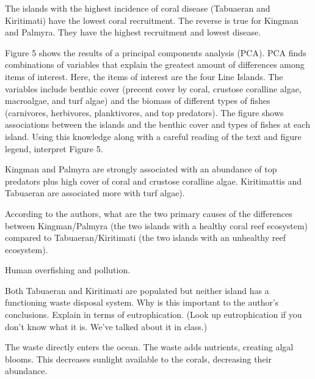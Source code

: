 \documentclass[11pt, addpoints]{exam}
\begin{document}
\begin{questions}
\begin{solution}
The islands with the highest incidence of coral disease (Tabuaeran and Kiritimati) have the lowest coral recruitment. The reverse is true for Kingman and Palmyra. They have the highest recruitment and lowest disease.
\end{solution}

\question[5]
Figure 5 shows the results of a principal components analysis (PCA). PCA finds combinations of variables that explain the greatest amount of differences among items of interest. Here, the items of interest are the four Line Islands. The variables include benthic cover (precent cover by coral, crustose coralline algae, macroalgae, and turf algae) and the biomass of different types of fishes (carnivores, herbivores, planktivores, and top predators). The figure shows associations between the islands and the benthic cover and types of fishes at each island. Using this knowledge along with a careful reading of the text and figure legend, interpret Figure 5.  

\begin{solution}
Kingman and Palmyra are strongly associated with an abundance of top predators plus high cover of coral and crustose coralline algae. Kiritimattis and Tabuaeran are associated more with turf algae).
\end{solution}


\question[5]
According to the authors, what are the two primary causes of the differences between Kingman/Palmyra (the two islands with a healthy coral reef ecosystem) compared to Tabuaeran/Kiritimati (the two islands with an unhealthy reef ecosystem). 
\begin{solution}
Human overfishing and pollution.  
\end{solution}


\question[5]
Both Tabuaeran and Kiritimati are populated but neither island has a functioning waste disposal system. Why is this important to the author's conclusions. Explain in terms of eutrophication. (Look up eutrophication if you don't know what it is. We've talked about it in class.)
\begin{solution}
The waste directly enters the ocean. The waste adds nutrients, creating algal blooms. This decreases sunlight available to the corals, decreasing their abundance.
\end{solution}
\end{questions}
\end{document}

